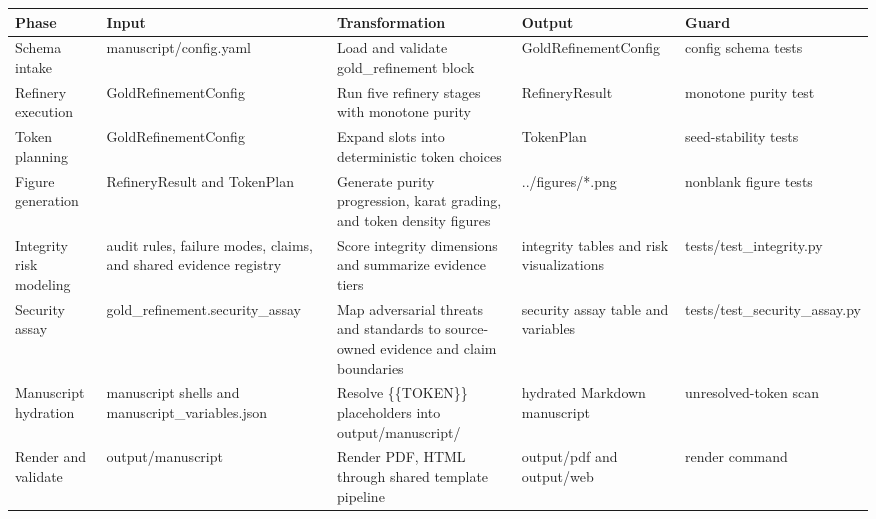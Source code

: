 \documentclass[
]{article}
\newcounter{none} %
\begin{document}
{\def\LTcaptype{none} %
\begin{longtable}[]{@{}
  >{\raggedright\arraybackslash}p{}
  >{\raggedright\arraybackslash}p{}
  >{\raggedright\arraybackslash}p{}
  >{\raggedright\arraybackslash}p{}
  >{\raggedright\arraybackslash}p{}@{}}
\toprule\noalign{}
\begin{minipage}[b]{\linewidth}\raggedright
Phase
\end{minipage} & \begin{minipage}[b]{\linewidth}\raggedright
Input
\end{minipage} & \begin{minipage}[b]{\linewidth}\raggedright
Transformation
\end{minipage} & \begin{minipage}[b]{\linewidth}\raggedright
Output
\end{minipage} & \begin{minipage}[b]{\linewidth}\raggedright
Guard
\end{minipage} \\
\midrule\noalign{}
\endhead
\bottomrule\noalign{}
\endlastfoot
Schema intake & manuscript/config.yaml & Load and validate
gold\_refinement block & GoldRefinementConfig & config schema tests \\
Refinery execution & GoldRefinementConfig & Run five refinery stages
with monotone purity & RefineryResult & monotone purity test \\
Token planning & GoldRefinementConfig & Expand slots into deterministic
token choices & TokenPlan & seed-stability tests \\
Figure generation & RefineryResult and TokenPlan & Generate purity
progression, karat grading, and token density figures & ../figures/*.png
& nonblank figure tests \\
Integrity risk modeling & audit rules, failure modes, claims, and shared
evidence registry & Score integrity dimensions and summarize evidence
tiers & integrity tables and risk visualizations &
tests/test\_integrity.py \\
Security assay & gold\_refinement.security\_assay & Map adversarial
threats and standards to source-owned evidence and claim boundaries &
security assay table and variables & tests/test\_security\_assay.py \\
Manuscript hydration & manuscript shells and manuscript\_variables.json
& Resolve \{\{TOKEN\}\} placeholders into output/manuscript/ & hydrated
Markdown manuscript & unresolved-token scan \\
Render and validate & output/manuscript & Render PDF, HTML through
shared template pipeline & output/pdf and output/web & render command \\
\end{longtable}
}
\end{document}
